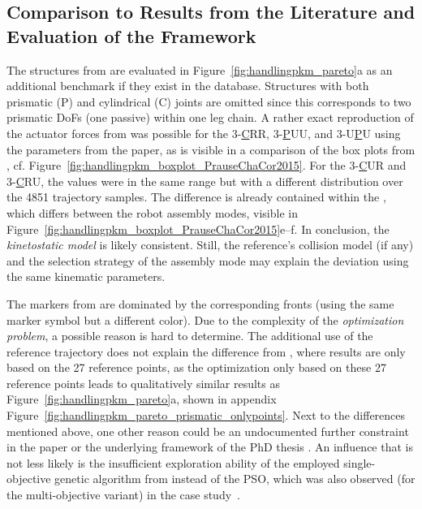 \subsection{Comparison to Results from the Literature and Evaluation of the Framework}
\label{sec:eval_handling_results_reference_comparison}

The structures from \cite{PrauseChaCor2015} are evaluated in Figure~\ref{fig:handlingpkm_pareto}a as an additional benchmark if they exist in the database.
Structures with both prismatic (P) and cylindrical (C) joints are omitted since this corresponds to two prismatic DoFs (one passive) within one leg chain.
%
A rather exact reproduction of the actuator forces from \cite{PrauseChaCor2015} was possible for the 3-\underline{C}RR, 3-\underline{P}UU, and 3-U\underline{P}U using the parameters from the paper, as is visible in a comparison of the box plots from \cite{PrauseChaCor2015}, cf. Figure~\ref{fig:handlingpkm_boxplot_PrauseChaCor2015}.
For the 3-\underline{C}UR and 3-\underline{C}RU, the values were in the same range but with a different distribution over the 4851 trajectory samples.
The difference is already contained within the , which differs between the robot assembly modes, visible in Figure~\ref{fig:handlingpkm_boxplot_PrauseChaCor2015}e--f.
In conclusion, the \emph{kinetostatic model} is likely consistent.
Still, the reference's collision model (if any) and the selection strategy of the assembly mode may explain the deviation using the same kinematic parameters.
%
%

The markers from \cite{PrauseChaCor2015} are dominated by the corresponding  fronts (using the same marker symbol but a different color).
Due to the complexity of the \emph{optimization problem}, a possible reason is hard to determine.
The additional use of the reference trajectory does not explain the difference  from \cite{PrauseChaCor2015}, where results are only based on the 27 reference points, as the optimization only based on these 27 reference points leads to qualitatively similar results as Figure~\ref{fig:handlingpkm_pareto}a, shown in appendix Figure~\ref{fig:handlingpkm_pareto_prismatic_onlypoints}.
Next to the differences mentioned above, one other reason could be an undocumented further constraint in the paper or the underlying framework of the PhD thesis \cite{Prause2016}.
An influence that is not less likely is the insufficient exploration ability of the employed single-objective genetic algorithm from \cite{MatlabGOT} instead of the PSO, which was also observed (for the multi-objective variant) in the case study~\cite{SchapplerJahRaaOrt2022}.


